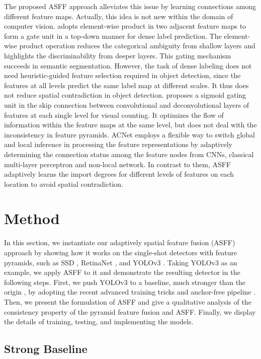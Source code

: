\documentclass[10pt,twocolumn,letterpaper]{article}
\begin{document}
The proposed ASFF approach alleviates this issue by learning connections among different feature maps. Actually, this idea is not new within the domain of computer vision. \cite{gated-2} adopts element-wise product in two adjacent feature maps to form a gate unit in a top-down manner for dense label prediction. The element-wise product operation reduces the categorical ambiguity from shallow layers and highlights the discriminability from deeper layers. This gating mechanism succeeds in semantic segmentation. However, the task of dense labeling does not need heuristic-guided feature selection required in object detection, since the features at all levels predict the same label map at different scales. It thus does not reduce spatial contradiction in object detection. \cite{gated-1} proposes a sigmoid gating unit in the skip connection between convolutional and deconvolutional layers of features at each single level for visual counting. It optimizes the flow of information within the feature maps at the same level, but does not deal with the inconsistency in feature pyramids. ACNet \cite{acnet} employs a flexible way to switch global and local inference in processing the feature representations by adaptively determining the connection status among the feature nodes from CNNs, classical multi-layer perceptron and non-local network. In contrast to them, ASFF adaptively learns the import degrees for different levels of features on each location to avoid spatial contradiction.

\section{Method}

In this section, we instantiate our adaptively spatial feature fusion (ASFF) approach by showing how it works on the single-shot detectors with feature pyramids, such as SSD \cite{ssd}, RetinaNet \cite{focal-loss}, and YOLOv3 \cite{yolov3}. Taking YOLOv3 as an example, we apply ASFF to it and demonstrate the resulting detector in the following steps. First, we push YOLOv3 to a baseline, much stronger than the origin \cite{yolov3}, by adopting the recent advanced training tricks \cite{bag} and anchor-free pipeline \cite{guide,FSAF}. Then, we present the formulation of ASFF and give a qualitative analysis of the consistency property of the pyramid feature fusion and ASFF. Finally, we display the details of training, testing, and implementing the models.

\subsection{Strong Baseline}
\end{document}
